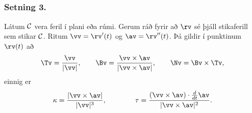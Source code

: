 \subsection{}
 \subsubsection{Setning 3.}
   Látum $\cal C$ vera feril í plani eða rúmi. 
Gerum ráð fyrir að $\rv$ sé þjáll stikaferill
sem stikar $\cal C$. Ritum $\vv=\rv'(t)$ og $\av=\rv''(t)$.
Þá gildir í punktinum $\rv(t)$ að
$$\Tv=\frac{\vv}{|\vv|},\qquad 
\Bv=\frac{\vv\times\av}{|\vv\times\av|},\qquad
\Nv=\Bv\times\Tv,$$
einnig er 
$$\kappa=\frac{|\vv\times\av|}{|\vv|^3},\qquad\qquad
\tau=\frac{(\vv\times\av)\cdot \frac{d}{dt}\av}{|\vv\times\av|^2}.$$

 



